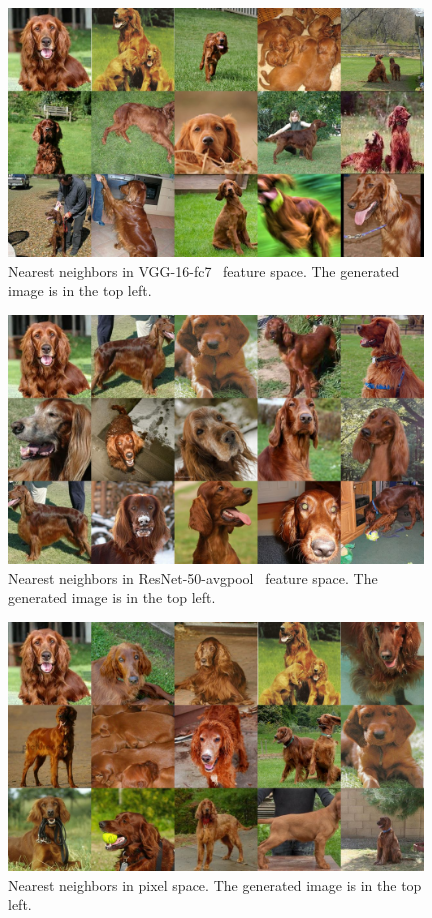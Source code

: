 \begin{figure}[htbp]
\centering
\includegraphics[width=0.98\textwidth]{images/neighbors/dog_vgg_fc7.jpg}
\caption{Nearest neighbors in VGG-16-fc7~\citep{simonyan15very} feature space. The generated image is in the top left.}
\label{appendix_nearest_dogVGG}
\end{figure}

\begin{figure}[htbp]
\centering
\includegraphics[width=0.98\textwidth]{images/neighbors/dog_resnet_flat.jpg}
\caption{Nearest neighbors in ResNet-50-avgpool~\citep{he2016resnets} feature space. The generated image is in the top left.}
\label{appendix_nearest_dogResNet}
\end{figure}


\begin{figure}[htbp]
\centering
\includegraphics[width=0.98\textwidth]{images/neighbors/dog_pixel.jpg}
\caption{Nearest neighbors in pixel space. The generated image is in the top left.}
\label{appendix_nearest_dogPixel}
\end{figure}

